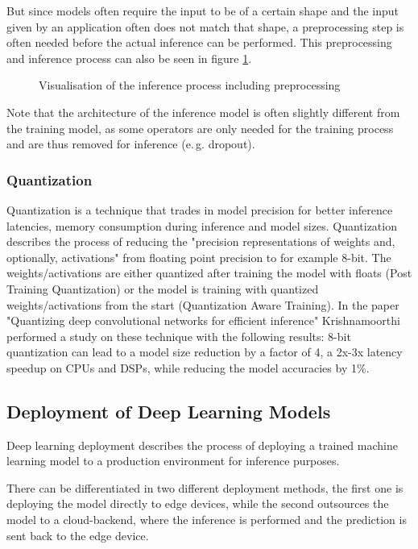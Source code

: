 But since models often require the input to be of a certain shape and the input given by an application often does not match that shape, a preprocessing step is often needed before the actual inference can be performed.
This preprocessing and inference process can also be seen in figure \ref{fig:InfProcess}.
\begin{figure}[H]
\centering

\caption{Visualisation of the inference process including preprocessing}
\label{fig:InfProcess}
\end{figure}
Note that the architecture of the inference model is often slightly different from the training model, as some operators are only needed for the training process and are thus removed for inference (e.\,g. dropout).






\subsubsection{Quantization}
\label{chap:quant}
Quantization is a technique that trades in model precision for better inference latencies, memory consumption during inference and model sizes.
Quantization describes the process of reducing the "precision representations of weights and, optionally, activations" \cite{tfLiteQuant} from floating point precision to for example 8-bit.
The weights/activations are either quantized after training the model with floats (Post Training Quantization) or the model is training with quantized weights/activations from the start (Quantization Aware Training). In the paper "Quantizing deep convolutional networks for
efficient inference"\cite{Quantizing} Krishnamoorthi performed a study on these technique with the following results:
8-bit quantization can lead to a model size reduction by a factor of 4, a 2x-3x latency speedup on CPUs and DSPs, while reducing the model accuracies by 1\%.


\subsection{Deployment of Deep Learning Models}
Deep learning deployment describes the process of deploying a trained machine learning model to a production environment for inference purposes. 

There can be differentiated in two different deployment methods, the first one is deploying the model directly to edge devices, while the second outsources the model to a cloud-backend, where the inference is performed and the prediction is sent back to the edge device.
